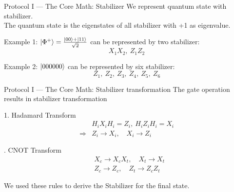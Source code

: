 \documentclass[aspectratio=169,10pt]{beamer}
\begin{document}
\begin{frame}{Protocol I — The Core Math: Stabilizer}
  We represent quantum state with stabilizer.\\
  The quantum state is the eigenstates of all stabilizer with +1 as eigenvalue.
  \pause
  
  \vspace{0.4em}
  
  Example 1: $\ket{\Phi^+}=\frac{\ket{00}+\ket{11}}{\sqrt{2}}$ can be represented by two stabilizer:
  \[
    \boxed{X_1X_2, \ Z_1Z_2}
  \]

  Example 2: $\ket{000000}$ can be represented by six stabilizer:
  \[
    \boxed{Z_1,\ Z_2,\ Z_3,\ Z_4,\ Z_5,\ Z_6}
  \]
  
\end{frame}

\begin{frame}{Protocol I — The Core Math: Stabilizer transformation}
  The gate operation results in stabilizer transformation
  \pause
  
  \vspace{0.4em}
  
  1. Hadamard Transform
    \begin{align}
       &H_iX_iH_i=Z_i ,\ H_iZ_iH_i=X_i \\
        \Rightarrow &Z_i\longrightarrow X_i, \quad X_i\longrightarrow Z_i
    \end{align}

  . CNOT Transform
    \begin{align}
       &X_c\longrightarrow X_cX_t, \quad X_t\longrightarrow X_t\\
        &Z_c\longrightarrow Z_c, \quad Z_t\longrightarrow Z_cZ_t
    \end{align}
    \pause

    We used these rules to derive the Stabilizer for the final state.
\end{frame}

\end{document}
